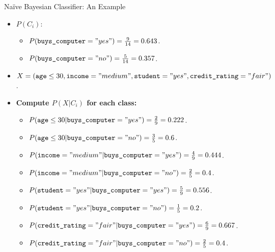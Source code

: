 \begin{frame}{Naïve Bayesian Classifier: An Example}
	\begin{itemize}
		\item $P(C_i)$:
		      \begin{itemize}
			      \item $P(\texttt{buys\_computer} = "yes") = \frac{9}{14} = 0.643$.
			      \item $P(\texttt{buys\_computer} = "no") = \frac{5}{14} = 0.357$.
		      \end{itemize}
		\item $X = (\texttt{age} \leq 30 , \texttt{income} = "medium", \texttt{student} = "yes", \texttt{credit\_rating} = "fair")$.
		\item \textbf{Compute $P(X|C_i)$ for each class:}
		      \begin{itemize}
			      \item $P(\texttt{age} \leq 30 | \texttt{buys\_computer} = "yes") = \frac{2}{9} = 0.222$.
			      \item $P(\texttt{age} \leq 30 | \texttt{buys\_computer} = "no") = \frac{3}{5} = 0.6$.
			      \item $P(\texttt{income} = "medium" | \texttt{buys\_computer} = "yes") = \frac{4}{9} = 0.444$.
			      \item $P(\texttt{income} = "medium" | \texttt{buys\_computer} = "no") = \frac{2}{5} = 0.4$.
			      \item $P(\texttt{student} = "yes" | \texttt{buys\_computer} = "yes") = \frac{5}{9} = 0.556$.
			      \item $P(\texttt{student} = "yes" | \texttt{buys\_computer} = "no") = \frac{1}{5} = 0.2$.
			      \item $P(\texttt{credit\_rating} = "fair" | \texttt{buys\_computer} = "yes") = \frac{6}{9} = 0.667$.
			      \item $P(\texttt{credit\_rating} = "fair" | \texttt{buys\_computer} = "no") = \frac{2}{5} = 0.4$.
		      \end{itemize}
	\end{itemize}
\end{frame}

